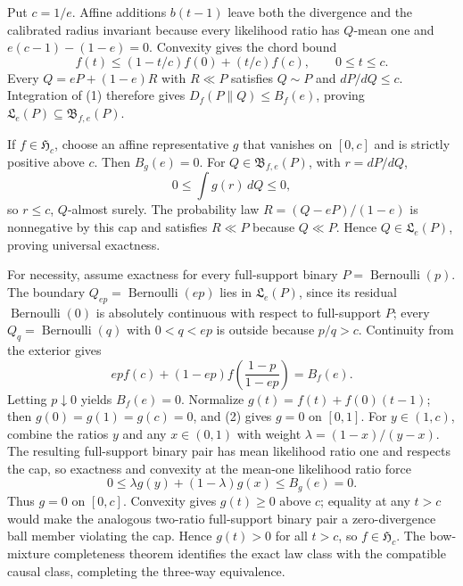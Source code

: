 Put \(c=1/e\).  Affine additions \(b(t-1)\) leave both the divergence and the calibrated radius invariant because every likelihood ratio has \(Q\)-mean one and \(e(c-1)-(1-e)=0\).  Convexity gives the chord bound
\[
 f(t)\le(1-t/c)f(0)+(t/c)f(c),\qquad 0\le t\le c. \tag{1}
\]
Every \(Q=eP+(1-e)R\) with \(R\ll P\) satisfies \(Q\sim P\) and \(dP/dQ\le c\).  Integration of (1) therefore gives \(D_f(P\|Q)\le B_f(e)\), proving \(\mathfrak L_e(P)\subseteq\mathfrak B_{f,e}(P)\).

If \(f\in\mathfrak H_c\), choose an affine representative \(g\) that vanishes on \([0,c]\) and is strictly positive above \(c\).  Then \(B_g(e)=0\).  For \(Q\in\mathfrak B_{f,e}(P)\), with \(r=dP/dQ\),
\[
 0\le\int g(r)\,dQ\le0,
\]
so \(r\le c\), \(Q\)-almost surely.  The probability law \(R=(Q-eP)/(1-e)\) is nonnegative by this cap and satisfies \(R\ll P\) because \(Q\ll P\).  Hence \(Q\in\mathfrak L_e(P)\), proving universal exactness.

For necessity, assume exactness for every full-support binary \(P=\operatorname{Bernoulli}(p)\).  The boundary \(Q_{ep}=\operatorname{Bernoulli}(ep)\) lies in \(\mathfrak L_e(P)\), since its residual \(\operatorname{Bernoulli}(0)\) is absolutely continuous with respect to full-support \(P\); every \(Q_q=\operatorname{Bernoulli}(q)\) with \(0<q<ep\) is outside because \(p/q>c\).  Continuity from the exterior gives
\[
 epf(c)+(1-ep)f\!\left(\frac{1-p}{1-ep}\right)=B_f(e). \tag{2}
\]
Letting \(p\downarrow0\) yields \(B_f(e)=0\).  Normalize \(g(t)=f(t)+f(0)(t-1)\); then \(g(0)=g(1)=g(c)=0\), and (2) gives \(g=0\) on \([0,1]\).  For \(y\in(1,c)\), combine the ratios \(y\) and any \(x\in(0,1)\) with weight \(\lambda=(1-x)/(y-x)\).  The resulting full-support binary pair has mean likelihood ratio one and respects the cap, so exactness and convexity at the mean-one likelihood ratio force
\[
 0\le\lambda g(y)+(1-\lambda)g(x)\le B_g(e)=0.
\]
Thus \(g=0\) on \([0,c]\).  Convexity gives \(g(t)\ge0\) above \(c\); equality at any \(t>c\) would make the analogous two-ratio full-support binary pair a zero-divergence ball member violating the cap.  Hence \(g(t)>0\) for all \(t>c\), so \(f\in\mathfrak H_c\).  The bow-mixture completeness theorem identifies the exact law class with the compatible causal class, completing the three-way equivalence.